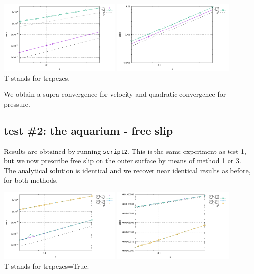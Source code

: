 \begin{center}
\includegraphics[width=6cm]{python_codes/fieldstone_151/results/test1/errv}
\includegraphics[width=6cm]{python_codes/fieldstone_151/results/test1/errp}\\
{\captionfont T stands for {\python trapezes}.}
\end{center}

We obtain a supra-convergence for velocity and quadratic convergence for pressure.

\subsection*{test \#2: the aquarium - free slip}

Results are obtained by running {\tt script2}. 
This is the same experiment as test 1, but we now prescribe free slip on the 
outer surface by means of method 1 or 3. The analytical solution is identical 
and we recover near identical results as before, for both methods.

\begin{center}
\includegraphics[width=6cm]{python_codes/fieldstone_151/results/test2/errv}
\includegraphics[width=6cm]{python_codes/fieldstone_151/results/test2/errp}\\
{\captionfont T stands for {\python trapezes=True}.}
\end{center}


